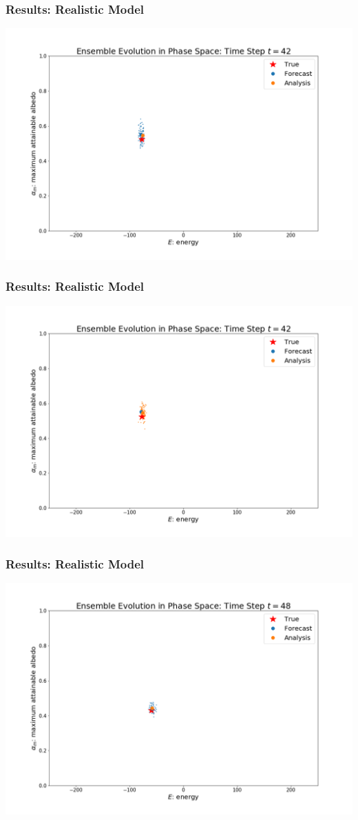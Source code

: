 \documentclass{beamer}
\begin{document}
\begin{frame}
\frametitle{Results: Realistic Model}
\centering
\includegraphics[width=\linewidth]{Figures/EnsembleEvolution_forecast_t=42.png}
\end{frame}
\begin{frame}
\frametitle{Results: Realistic Model}
\centering
\includegraphics[width=\linewidth]{Figures/EnsembleEvolution_analysis_t=42.png}
\end{frame}
\begin{frame}
\frametitle{Results: Realistic Model}
\centering
\includegraphics[width=\linewidth]{Figures/EnsembleEvolution_forecast_t=48.png}
\end{frame}
\end{document}
